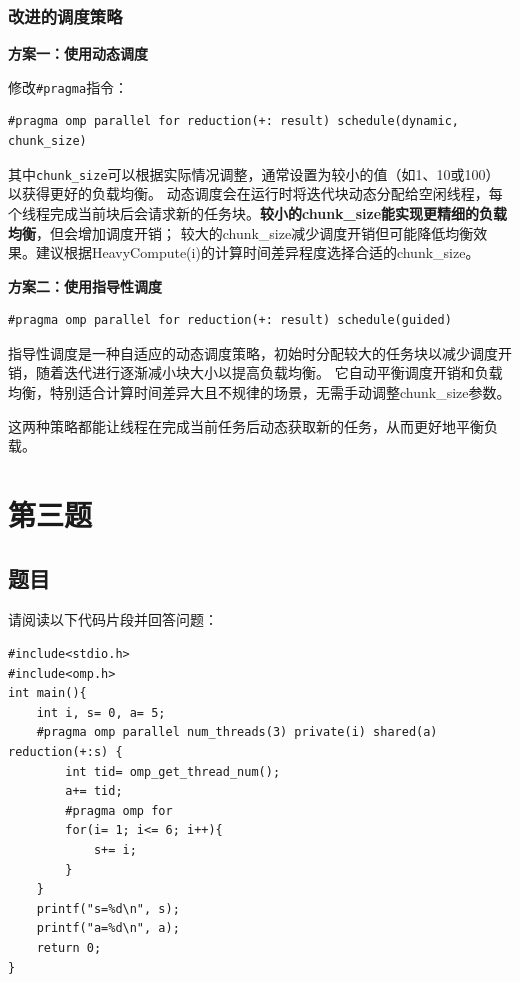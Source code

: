\subsection{改进的调度策略}

\textbf{方案一：使用动态调度}

修改\texttt{\#pragma}指令：

\begin{lstlisting}[style=cleancpp]
#pragma omp parallel for reduction(+: result) schedule(dynamic, chunk_size)
\end{lstlisting}

其中\texttt{chunk\_size}可以根据实际情况调整，通常设置为较小的值（如1、10或100）以获得更好的负载均衡。
动态调度会在运行时将迭代块动态分配给空闲线程，每个线程完成当前块后会请求新的任务块。\textbf{较小的chunk\_size能实现更精细的负载均衡}，但会增加调度开销；
较大的chunk\_size减少调度开销但可能降低均衡效果。建议根据HeavyCompute(i)的计算时间差异程度选择合适的chunk\_size。

\textbf{方案二：使用指导性调度}

\begin{lstlisting}[style=cleancpp]
#pragma omp parallel for reduction(+: result) schedule(guided)
\end{lstlisting}

指导性调度是一种自适应的动态调度策略，初始时分配较大的任务块以减少调度开销，随着迭代进行逐渐减小块大小以提高负载均衡。
它自动平衡调度开销和负载均衡，特别适合计算时间差异大且不规律的场景，无需手动调整chunk\_size参数。

这两种策略都能让线程在完成当前任务后动态获取新的任务，从而更好地平衡负载。

\chapter{第三题}

\section{题目}

请阅读以下代码片段并回答问题：
\begin{lstlisting}[style=cleancpp]
#include<stdio.h>
#include<omp.h> 
int main(){ 
    int i, s= 0, a= 5;
    #pragma omp parallel num_threads(3) private(i) shared(a) reduction(+:s) { 
        int tid= omp_get_thread_num(); 
        a+= tid;
        #pragma omp for 
        for(i= 1; i<= 6; i++){ 
            s+= i;
        }
    } 
    printf("s=%d\n", s); 
    printf("a=%d\n", a); 
    return 0;
}
\end{lstlisting}

